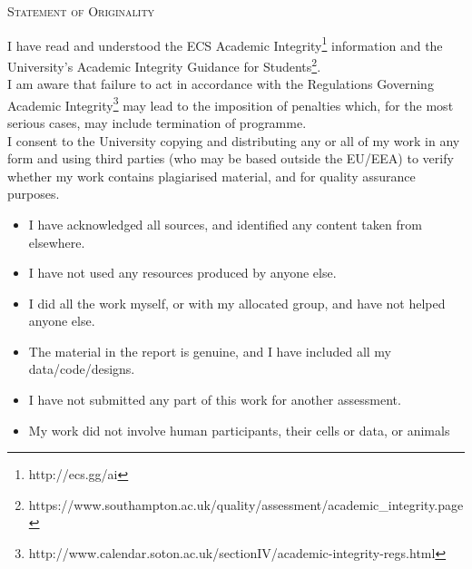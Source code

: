 \documentclass[12pt]{article}
\begin{document}


\newpage

\begin{center}
    \textsc{\LARGE Statement of Originality} \\ [1cm]
\end{center}
I have read and understood the ECS Academic Integrity\footnote{http://ecs.gg/ai} information and the University’s
Academic Integrity Guidance for Students\footnote{https://www.southampton.ac.uk/quality/assessment/academic\_integrity.page}.
\\[0.3cm]
I am aware that failure to act in accordance with the Regulations Governing Academic Integrity\footnote{http://www.calendar.soton.ac.uk/sectionIV/academic-integrity-regs.html}
may lead to the imposition of penalties which, for the most serious cases, may include
termination of programme.
\\[0.3cm]
I consent to the University copying and distributing any or all of my work in any form and
using third parties (who may be based outside the EU/EEA) to verify whether my work
contains plagiarised material, and for quality assurance purposes.
\\[0.5cm]

\begin{itemize}
    \item I have acknowledged all sources, and identified any content taken from elsewhere.
    \item I have not used any resources produced by anyone else.
    \item I did all the work myself, or with my allocated group, and have not helped anyone else.
    \item The material in the report is genuine, and I have included all my data/code/designs.
    \item I have not submitted any part of this work for another assessment.
    \item My work did not involve human participants, their cells or data, or animals
\end{itemize}



\newpage
\tableofcontents
\end{document}
